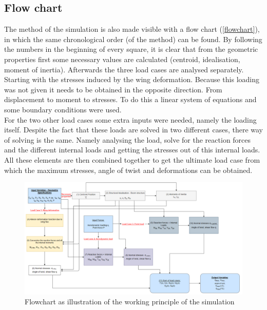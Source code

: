 \subsection{Flow chart}
The method of the simulation is also made visible with a flow chart (\autoref{flowchart}), in which the same chronological order (of the method) can be found. By following the numbers in the beginning of every square, it is clear that from the geometric properties first some necessary values are calculated (centroid, idealisation, moment of inertia). Afterwards the three load cases are analysed separately. Starting with the stresses induced by the wing deformation. Because this loading was not given it needs to be obtained in the opposite direction. From displacement to moment to stresses. To do this a linear system of equations and some boundary conditions were used.\\

\noindent For the two other load cases some extra inputs were needed, namely the loading itself. Despite the fact that these loads are solved in two different cases, there way of solving is the same. Namely analysing the load, solve for the reaction forces and the different internal loads and getting the stresses out of this internal loads.\\

\noindent All these elements are then combined together to get the ultimate load case from which the maximum stresses, angle of twist and deformations can be obtained.


\label{subsec:Flow_chart}
\begin{figure}[H]
    \centering
    \includegraphics[width=23cm, angle=90]{Images/Flowchart3.PNG}
    \caption{Flowchart as illustration of the working principle of the simulation }
    \label{flowchart}
\end{figure}



















